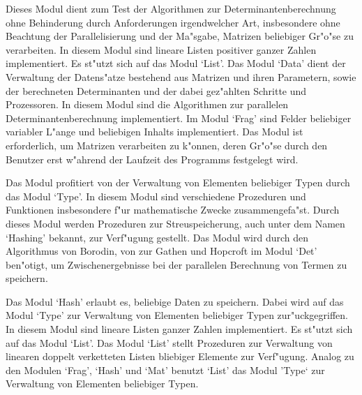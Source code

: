 \begin{MyDescription}
    Dieses Modul dient zum Test der Algorithmen zur 
    Determinantenberechnung ohne Behinderung durch Anforderungen 
    irgendwelcher Art, insbesondere
    ohne Beachtung der Parallelisierung und der Ma"sgabe, Matrizen
    beliebiger Gr"o"se zu verarbeiten.
    In diesem Modul sind lineare Listen positiver ganzer Zahlen 
    implementiert. Es st"utzt sich auf das Modul `List'.
    Das Modul `Data' dient der Verwaltung der Datens"atze bestehend aus 
    Matrizen und ihren Parametern, sowie der berechneten Determinanten 
    und der dabei gez"ahlten Schritte und Prozessoren.
    In diesem Modul sind die Algorithmen zur parallelen
    Determinantenberechnung implementiert.
    Im Modul `Frag' sind Felder beliebiger variabler L"ange und beliebigen
    Inhalts implementiert. Das Modul ist erforderlich, um Matrizen 
    verarbeiten zu k"onnen, deren Gr"o"se durch den Benutzer erst w"ahrend 
    der Laufzeit des Programms festgelegt wird.
    
    Das Modul profitiert von der Verwaltung von 
    Elementen beliebiger Typen durch das Modul `Type'.
    In diesem Modul sind verschiedene Prozeduren und Funktionen 
    insbesondere f"ur mathematische Zwecke zusammengefa"st.
    Durch dieses Modul werden Prozeduren zur Streuspeicherung, auch unter
    dem Namen `Hashing' bekannt, zur Verf"ugung gestellt. Das Modul wird 
    durch den Algorithmus von Borodin, von zur Gathen und Hopcroft im 
    Modul `Det' ben"otigt, um Zwischenergebnisse bei der parallelen 
    Berechnung von Termen zu speichern.
    
    Das Modul `Hash' erlaubt es, beliebige Daten zu speichern. Dabei wird
    auf das Modul `Type' zur Verwaltung von Elementen beliebiger Typen
    zur"uckgegriffen.
    In diesem Modul sind lineare Listen ganzer Zahlen 
    implementiert. Es st"utzt sich auf das Modul `List'.
    Das Modul `List' stellt Prozeduren zur Verwaltung von linearen 
    doppelt verketteten Listen bliebiger Elemente zur Verf"ugung. Analog
    zu den Modulen `Frag', `Hash' und `Mat' benutzt `List' das Modul
    'Type` zur Verwaltung von Elementen beliebiger Typen.
    

\end{MyDescription}
